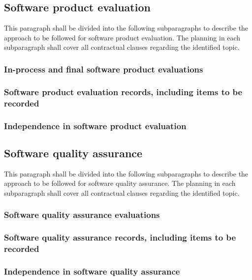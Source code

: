 \documentclass{fidata-report-template}
\begin{document}
\subsection{Software product evaluation}

This paragraph shall be divided into the following subparagraphs to
describe the approach to be followed for software product evaluation.
The planning in each subparagraph shall cover all contractual clauses
regarding the identified topic.

\subsubsection{In-process and final software product evaluations}

\subsubsection{Software product evaluation records, including items to
be recorded}

\subsubsection{Independence in software product evaluation}

\subsection{Software quality assurance}

This paragraph shall be divided into the following subparagraphs to
describe the approach to be followed for software quality assurance. The
planning in each subparagraph shall cover all contractual clauses
regarding the identified topic.

\subsubsection{Software quality assurance evaluations}

\subsubsection{Software quality assurance records, including items to
be recorded}

\subsubsection{Independence in software quality assurance}
\end{document}
